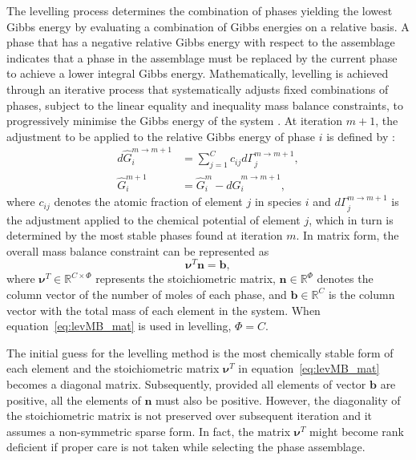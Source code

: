 	The levelling process determines the combination of phases yielding the lowest Gibbs energy by evaluating a combination of Gibbs energies on a relative basis. A phase that has a negative relative Gibbs energy with respect to the assemblage indicates that a phase in the assemblage must be replaced by the current phase to achieve a lower integral Gibbs energy. Mathematically, levelling is achieved through an iterative process that systematically adjusts fixed combinations of phases, subject to the linear equality and inequality mass balance constraints, to progressively minimise the Gibbs energy of the system \cite{Piro12a}. At iteration $m+1$, the adjustment to be applied to the relative Gibbs energy of phase $i$ is defined by \cite{Eriksson89}:
	\begin{equation} \label{eq:lev_adj}
		\begin{aligned}
			d \hat{G}_i^{m\rightarrow m+1} &= \sum_{j=1}^{C} c_{ij} d \Gamma_j^{m\rightarrow m+1},\\
			\hat{G}_i^{m+1} &= \hat{G}_i^{m} - d \hat{G}_i^{m\rightarrow m+1},
		\end{aligned}
	\end{equation}
	where $c_{ij}$ denotes the atomic fraction of element $j$ in species $i$ and $d \Gamma_j^{m\rightarrow m+1}$ is the adjustment applied to the chemical potential of element $j$, which in turn is determined by the most stable phases found at iteration $m$. In  matrix form, the overall mass balance constraint can be represented as \cite{Piro12a}
	\begin{equation} \label{eq:levMB_mat}
		\boldsymbol{\nu}^T \mathbf{n}= \mathbf{b},
	\end{equation}
	where $\boldsymbol{\nu}^T \in \mathbb{R}^{C \times \Phi}$ represents the stoichiometric matrix, $\mathbf{n} \in \mathbb{R}^{\Phi}$ denotes the column vector of the number of moles of each phase, and $\mathbf{b} \in \mathbb{R}^{C}$ is the column vector with the total mass of each element in the system. When equation~\ref{eq:levMB_mat} is used in levelling, $\Phi = C$.

	The initial guess for the levelling method is the most chemically stable form of each element and the stoichiometric matrix $\boldsymbol{\nu}^T$ in equation~\eqref{eq:levMB_mat} becomes a diagonal matrix. Subsequently, provided all elements of vector $\mathbf{b}$ are positive, all the elements of $\mathbf{n}$ must also be positive. However, the diagonality of the stoichiometric matrix is not preserved over subsequent iteration and it assumes a non-symmetric sparse form. In fact, the matrix $\boldsymbol{\nu}^T$ might become rank deficient if proper care is not taken while selecting the phase assemblage.

